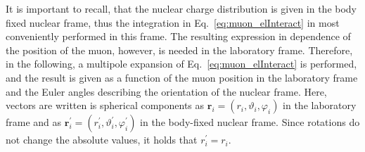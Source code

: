 It is important to recall, that the nuclear charge distribution is given in the body fixed nuclear frame, thus the integration in Eq.~\eqref{eq:muon_elInteract} in most conveniently performed in this frame. The resulting expression in dependence of the position of the muon, however, is needed in the laboratory frame. Therefore, in the following, a multipole expansion of Eq.~\eqref{eq:muon_elInteract} is performed, and the result is given as a function of the muon position in the laboratory frame and the Euler angles describing the orientation of the nuclear frame. Here, vectors are written is spherical components as $\mathbf{r}_i = (r_i,\vartheta_i,\varphi_i)$ in the laboratory frame and as $\mathbf{r}_i^\prime = (r_i^\prime,\vartheta_i^\prime,\varphi_i^\prime)$ in the body-fixed nuclear frame. Since rotations do not change the absolute values, it holds that $r_i^\prime = r_i$.

